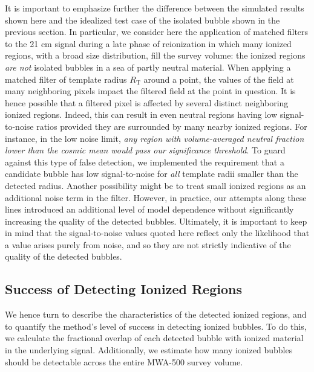 It is important to emphasize further the difference between the
simulated results shown here and the idealized test case of the
isolated bubble shown in the previous section. In particular, we
consider here the application of matched filters to the 21 cm signal
during a late phase of reionization  in which many ionized regions,
with a broad size distribution, fill the survey volume: the ionized
regions {\em are not} isolated bubbles in a sea of partly neutral
material. When applying a matched filter of template radius
$R_{\text{T}}$ around a point, the values of the field at many
neighboring pixels impact the filtered field at the point in
question. It is hence possible that a filtered pixel is affected by
several distinct neighboring ionized regions. Indeed, this can result
in even neutral regions having low signal-to-noise ratios provided
they are surrounded by many nearby ionized regions. For instance, in
the low noise limit, {\em any region with volume-averaged neutral
  fraction lower than the cosmic mean would pass our significance
  threshold}.  To guard against this type of false detection, we
implemented the requirement that a candidate bubble has low signal-to-noise 
for {\em all} template radii smaller than the detected
radius. Another possibility might be to treat small ionized regions as
an additional noise term in the filter. However, in practice, our attempts along
these lines introduced an additional level of model dependence without
significantly increasing the quality of the
detected bubbles. Ultimately, it is important to keep
in mind that the signal-to-noise values quoted here reflect only the
likelihood that a value arises purely from noise, and so they
are not strictly indicative of the quality of the
detected bubbles. 


\subsection{Success of Detecting Ionized Regions} \label{sec:Bubblesuccess}

We hence turn to describe the characteristics of the detected ionized regions,
and to quantify the method's level of success in detecting ionized bubbles. To do this, we
calculate the fractional overlap of each detected bubble with
ionized material in the underlying signal. Additionally, we estimate how
many ionized bubbles should be detectable across the entire MWA-500
survey volume.

